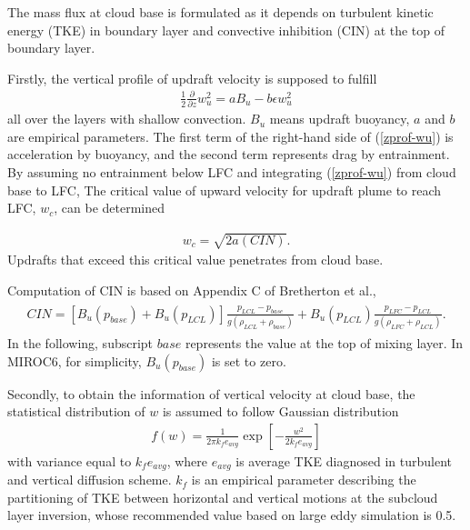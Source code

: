 The mass flux at cloud base is formulated as it depends on turbulent kinetic energy (TKE) in boundary layer and convective inhibition (CIN) at the top of boundary layer.

Firstly, the vertical profile of updraft velocity is supposed to fulfill \begin{eqnarray}\label{zprof-wu}
    \frac{1}{2}\frac{\partial}{\partial z}w_u^2=aB_u-b\epsilon w_u^2\end{eqnarray} all over the layers with shallow convection. \(B_u\) means updraft buoyancy, \(a\) and \(b\) are empirical parameters. The first
term of the right-hand side of (\ref{zprof-wu}) is acceleration by buoyancy, and the second term represents drag by entrainment. By assuming no entrainment below LFC and integrating
(\ref{zprof-wu}) from cloud base to LFC, The critical value of upward velocity for updraft plume to reach LFC, \(w_c\), can be determined

\begin{eqnarray}\label{wc}
    w_c = \sqrt{2a(CIN)}.\end{eqnarray} Updrafts that exceed this critical value penetrates from cloud base.

Computation of CIN is based on Appendix C of Bretherton et al., \begin{eqnarray}\begin{aligned}
\label{def-CIN}
    CIN = [B_u(p_{base}) + B_u(p_{LCL})]\frac{p_{LCL}-p_{base}}{g(\rho_{LCL}+\rho_{base})} + B_u(p_{LCL})\frac{p_{LFC}-p_{LCL}}{g(\rho_{LFC}+\rho_{LCL})}.\end{aligned}\end{eqnarray} In the following, subscript
\(\mathit{base}\) represents the value at the top of mixing layer. In MIROC6, for simplicity, \(B_u(p_{base})\) is set to zero.

Secondly, to obtain the information of vertical velocity at cloud base, the statistical distribution of \(w\) is assumed to follow Gaussian distribution \begin{eqnarray}\label{distr-w}
    f(w) = \frac{1}{2\pi k_f e_{avg}}\exp\left[ -\frac{w^2}{2k_fe_{avg}}\right]\end{eqnarray} with variance equal to \(k_f e_{avg}\), where \(e_{avg}\) is average TKE diagnosed in turbulent and vertical diffusion
scheme. \(k_f\) is an empirical parameter describing the partitioning of TKE between horizontal and vertical motions at the subcloud layer inversion, whose recommended value based on large eddy
simulation is 0.5.

